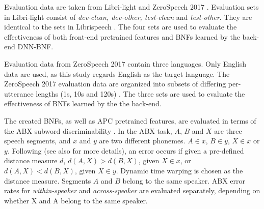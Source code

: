 \documentclass[a4paper]{article}
\newcommand{\quotes}[1]{``#1''}
\begin{document}
Evaluation data are taken from  Libri-light and ZeroSpeech 2017 \cite{dunbar2017zero}. Evaluation sets in Libri-light consist of \textit{dev-clean, dev-other, test-clean} and \textit{test-other}. 
They are identical to the sets in Librispeech
\cite{panayotov2015librispeech}. 
The four sets are used to evaluate the effectiveness of  both front-end pretrained features and  BNFs learned by the back-end DNN-BNF.

Evaluation data from ZeroSpeech 2017 contain three languages. Only English data are used, as this study regards English as the target language.
The ZeroSpeech 2017 evaluation data are organized into subsets of differing  per-utterance lengths (1s, 10s and 120s)  \cite{dunbar2017zero}.
The three sets are used to evaluate the effectiveness of BNFs learned by the the back-end.




The created BNFs, as well as APC pretrained features, are evaluated in terms of the ABX subword discriminability \cite{dunbar2017zero}.
In the ABX task, $A$, $B$ and $X$ are three speech segments, and $x$ and $y$ are two different phonemes. $A \in x$, $B \in y$, $X \in x$ or $y$. Following \cite{dunbar2017zero} (see also for more details), an error occurs if given a pre-defined distance measure $d$, $d(A,X) > d(B,X)$, given $X \in x$, 
or $d(A,X) < d(B,X)$, given $X \in y$.
Dynamic time warping is chosen as the distance measure. Segments $A$ and $B$   belong to the same speaker. ABX error rates for \textit{within-speaker} and \textit{across-speaker} are evaluated separately, depending
on whether X and A belong to the same speaker.
\end{document}
